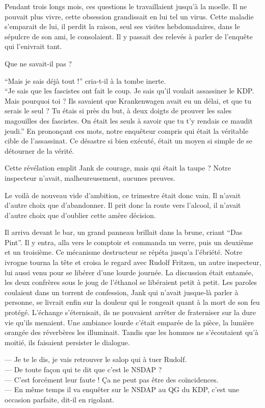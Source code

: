 Pendant trois longs mois, ces questions le travaillaient jusqu'à la moelle.
Il ne pouvait plus vivre, cette obsession grandissait en lui tel un virus.
Cette maladie s'emparait de lui, il perdit la raison, seul ses visites hebdomadaires, dans le sépulcre de son ami, le consolaient.
Il y passait des relevés à parler de l'enquête qui l'enivrait tant.

Que ne savait-il pas ?

\enquote{Mais je sais déjà tout !} cria-t-il à la tombe inerte.\\
\enquote{Je sais que les fascistes ont fait le coup. Je sais qu'il voulait assassiner le KDP.
Mais pourquoi toi ? 
Ils savaient que Krankenwagen avait eu un délai, et que tu serais le seul ?
Tu étais si près du but, à deux doigts de prouver les sales magouilles des fascistes.
On était les seuls à savoir que tu t'y rendais ce maudit jeudi.} 
En prononçant ces mots, notre enquêteur compris qui était la véritable cible de l'assassinat.
Ce désastre si bien exécuté, était un moyen si simple de se détourner de la vérité.

Cette révélation emplit Jank de courage, mais qui était la taupe ? 
Notre inspecteur n'avait, malheureusement, aucunes preuves. 

Le voilà de nouveau vide d'ambition, ce trimestre était donc vain. 
Il n'avait d'autre choix que d'abandonner.
Il prit donc la route vers l'alcool, il n'avait d'autre choix que d'oublier cette amère décision.

Il arriva devant le bar, un grand panneau brillait dans la brune, criant \enquote{{\tgothfamily Das Pint}}.
Il y entra, alla vers le comptoir et commanda un verre, puis un deuxième et un troisième.
Ce mécanisme destructeur se répéta jusqu'a l'ébriété. 
Notre ivrogne tourna la tête et croisa le regard avec Rudolf Fritzen, un autre inspecteur, lui aussi venu pour se libérer d'une lourde journée.
La discussion était entamée, les deux confrères sous le joug de l'éthanol se libéraient petit à petit. 
Les paroles coulaient dans un torrent de confession, Jank qui n'avait jusque-là parler à personne, se livrait enfin 
sur la douleur qui le rongeait quant à la mort de son feu protégé.
L'échange s'éternisait, ils ne pouvaient arrêter de fraterniser sur la dure vie qu'ils menaient.
Une ambiance lourde c'était emparée de la pièce, la lumière orangée des réverbères les illuminait. 
Tandis que les hommes ne s'écoutaient qu'à moitié, ils faisaient persister le dialogue.

--- Je te le dis, je vais retrouver le salop qui à tuer Rudolf.\\
--- De toute façon qui te dit que c'est le NSDAP ?\\
--- C'est forcément leur faute ! Ça ne peut pas être des coïncidences.\\
--- En même temps il va enquêter sur le NSDAP au QG du KDP, c'est une occasion parfaite, dit-il en rigolant.

